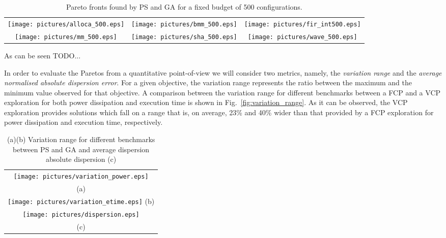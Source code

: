 \begin{itemize}
\begin{table*}
  \centering
  \begin{tabular}{ccc}
    \texttt{[image: pictures/alloca\_500.eps]} &
    \texttt{[image: pictures/bmm\_500.eps]} & 
    \texttt{[image: pictures/fir\_int500.eps]} \\
    \texttt{[image: pictures/mm\_500.eps]} &
    \texttt{[image: pictures/sha\_500.eps]} &
    \texttt{[image: pictures/wave\_500.eps]} 
  \end{tabular}
  \caption{Pareto fronts found by PS and GA for a fixed budget of 500 configurations.}
  \label{fig:pareto_fronts_500}
\end{table*}

As can be seen TODO...


In order to evaluate the Paretos from a quantitative point-of-view we
will consider two metrics, namely, the \emph{variation range} and the
\emph{average normalised absolute dispersion error}. For a given
objective, the variation range represents the ratio between the
maximum and the minimum value observed for that objective. A
comparison between the variation range for different benchmarks
between a FCP and a VCP exploration for both power dissipation and
execution time is shown in Fig.~\ref{fig:variation_range}. As it can
be observed, the VCP exploration provides solutions which fall on a
range that is, on average, 23\% and 40\% wider than that provided by a
FCP exploration for power dissipation and execution time,
respectively.
\begin{table}
  \centering
  \begin{tabular}{c}
    \texttt{[image: pictures/variation\_power.eps]} \\
    (a) \\
    \texttt{[image: pictures/variation\_etime.eps]}
    (b) \\
    \texttt{[image: pictures/dispersion.eps]} \\
    (c) 
  \end{tabular}
  \caption{(a)(b) Variation range for different benchmarks between PS and GA
  and average dispersion absolute dispersion (c)}
  \label{fig:dispersion}
\end{table}



\end{itemize}

